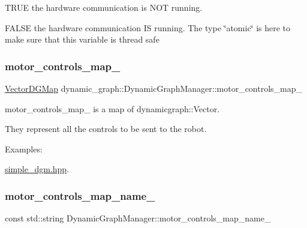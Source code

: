 \begin{DoxyItemize}
\item T\+R\+UE the hardware communication is N\+OT running.
\item F\+A\+L\+SE the hardware communication IS running. The type \char`\"{}atomic\char`\"{} is here to make sure that this variable is thread safe 
\end{DoxyItemize}\mbox{\label{classdynamic__graph_1_1DynamicGraphManager_a03eabd2f08990a1dcc1caa652b701020}} 
\subsubsection{\texorpdfstring{motor\+\_\+controls\+\_\+map\+\_\+}{motor\_controls\_map\_}}
{\footnotesize\ttfamily \hyperlink{namespacedynamic__graph_abd184187f3bc15df5e227d866529e4a7}{Vector\+D\+G\+Map} dynamic\+\_\+graph\+::\+Dynamic\+Graph\+Manager\+::motor\+\_\+controls\+\_\+map\+\_\+\hspace{0.3cm}{\ttfamily [protected]}}



motor\+\_\+controls\+\_\+map\+\_\+ is a map of dynamicgraph\+::\+Vector. 

They represent all the controls to be sent to the robot. \begin{Desc}
\item[Examples\+: ]\par
\hyperlink{simple_dgm_8hpp-example}{simple\+\_\+dgm.\+hpp}.\end{Desc}
\mbox{\label{classdynamic__graph_1_1DynamicGraphManager_a056de4d7a49496b2b0812d96d93370d9}} 
\subsubsection{\texorpdfstring{motor\+\_\+controls\+\_\+map\+\_\+name\+\_\+}{motor\_controls\_map\_name\_}}
{\footnotesize\ttfamily const std\+::string Dynamic\+Graph\+Manager\+::motor\+\_\+controls\+\_\+map\+\_\+name\+\_\+\hspace{0.3cm}{\ttfamily [static]}}


